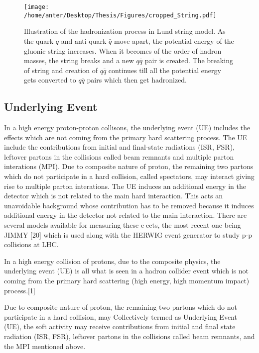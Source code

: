 \begin{figure}[!h]
\begin{center}
\hspace*{-4mm}
\texttt{[image: /home/anter/Desktop/Thesis/Figures/cropped\_String.pdf]}\\
\vspace*{4mm}
\caption[String]{Illustration of the hadronization process in Lund string model\footnotemark. As the quark $q$ and anti-quark $\bar{q}$ move apart, the potential energy of the gluonic string increases. When it becomes of the order of hadron masses, the string breaks and a new $q\bar{q}$ pair is created. The breaking of string and creation of $q\bar{q}$ continues till all the potential energy gets converted to $q\bar{q}$ pairs which then get hadronized.}
\label{fig:string}
\end{center}
\end{figure}

\subsection{Underlying Event}
In a high energy proton-proton collisons, the underlying event (UE) includes the effects which are not coming from the primary hard scattering process. The UE include the contributions from initial and final-state radiations (ISR, FSR), leftover partons in the collisions called beam remnants and multiple parton interations (MPI). Due to composite nature of proton, the remaining two partons which do not participate in a hard collision, called spectators, may interact giving rise to multiple parton interations. The UE induces an additional energy in the detector which is not related to the main hard interaction. This acts an unavoidable background whose contribution has to be removed because it induces additional energy in the detector not related to the main interaction. There are
several models available for measuring these eects, the most recent one being JIMMY
[20] which is used along with the HERWIG event generator to study p-p collisions at
LHC.

 In a high energy collision of protons, due to the composite physics, the underlying event (UE) is all what is seen in a hadron collider event which is not coming from the primary hard scattering (high energy, high momentum impact) process.[1]


Due to composite nature of proton, the remaining two partons which do not participate in a hard collision, may 
Collectively termed as Underlying Event (UE), the soft activity may receive contributions
from initial and final state radiation (ISR, FSR), leftover partons in the collisions called beam
remnants, and the MPI mentioned above. 


